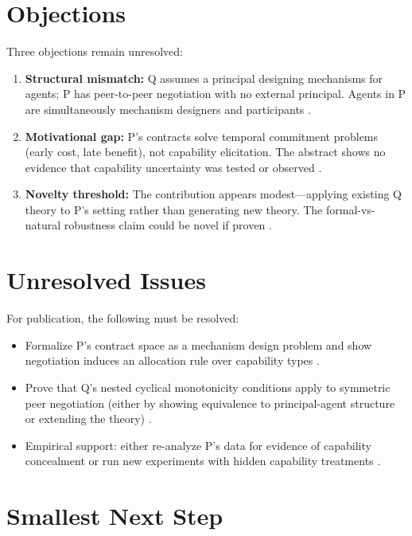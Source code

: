 \documentclass{article}
\begin{document}
\section*{Objections}

Three objections remain unresolved:

\begin{enumerate}
    \item \textbf{Structural mismatch:} Q assumes a principal designing mechanisms for agents; P has peer-to-peer negotiation with no external principal. Agents in P are simultaneously mechanism designers and participants .
    \item \textbf{Motivational gap:} P's contracts solve temporal commitment problems (early cost, late benefit), not capability elicitation. The abstract shows no evidence that capability uncertainty was tested or observed .
    \item \textbf{Novelty threshold:} The contribution appears modest---applying existing Q theory to P's setting rather than generating new theory. The formal-vs-natural robustness claim could be novel if proven .
\end{enumerate}

\section*{Unresolved Issues}

For publication, the following must be resolved:

\begin{itemize}
    \item Formalize P's contract space as a mechanism design problem and show negotiation induces an allocation rule over capability types .
    \item Prove that Q's nested cyclical monotonicity conditions apply to symmetric peer negotiation (either by showing equivalence to principal-agent structure or extending the theory) .
    \item Empirical support: either re-analyze P's data for evidence of capability concealment or run new experiments with hidden capability treatments .
\end{itemize}

\section*{Smallest Next Step}
\end{document}

